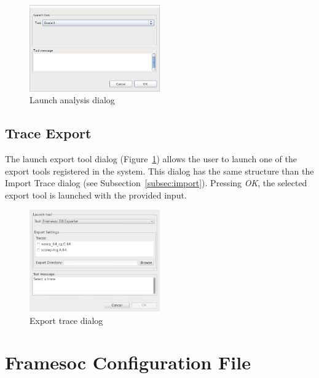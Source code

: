 \documentclass[twoside]{article}
\begin{document}
\begin{sloppypar}
\begin{figure}[h!]
  \centering
    \includegraphics[width=0.5\textwidth]{images/analysis_dialog.png}
  \caption{Launch analysis dialog}
  \label{fig:analysis_dialog}
\end{figure}

\subsection{Trace Export}
\label{subsec:export}

The launch export tool dialog (Figure~\ref{fig:analysis_dialog}) allows the user to launch one of the export tools registered in the system.
This dialog has the same structure than the Import Trace dialog (see Subsection~\ref{subsec:import}). 
Pressing \emph{OK}, the selected export tool is launched with the provided input. 

\begin{figure}[h!]
  \centering
    \includegraphics[width=0.5\textwidth]{images/export_dialog.png}
  \caption{Export trace dialog}
  \label{fig:export_dialog}
\end{figure}

\newpage

\appendix

\section{Framesoc Configuration File}
\label{app:conf}


\end{sloppypar}
\end{document}

